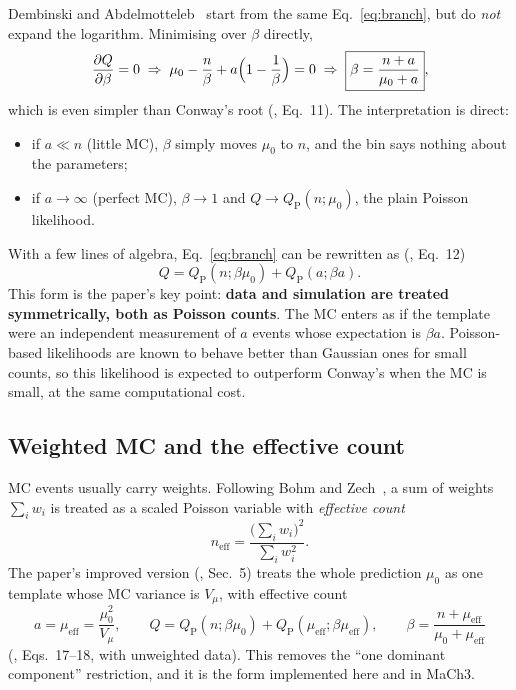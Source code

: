 \documentclass[11pt,a4paper]{article}
\newcommand{\QP}{Q_{\mathrm{P}}}
\begin{document}
Dembinski and Abdelmotteleb~\cite{DA} start from the same Eq.~\eqref{eq:branch}, but do
\emph{not} expand the logarithm. Minimising over $\beta$ directly,
\begin{equation}
  \frac{\partial Q}{\partial\beta}=0 \;\Rightarrow\;
  \mu_0 - \frac{n}{\beta} + a\Bigl(1-\frac1\beta\Bigr) = 0
  \;\Rightarrow\;
  \boxed{\beta = \frac{n+a}{\mu_0+a}} ,
  \label{eq:da-beta}
\end{equation}
which is even simpler than Conway's root (\cite{DA}, Eq.~11). The interpretation is direct:
\begin{itemize}
  \item if $a\ll n$ (little MC), $\beta$ simply moves $\mu_0$ to $n$, and the bin says nothing about
        the parameters;
  \item if $a\to\infty$ (perfect MC), $\beta\to1$ and $Q\to\QP(n;\mu_0)$, the plain Poisson likelihood.
\end{itemize}
With a few lines of algebra, Eq.~\eqref{eq:branch} can be rewritten as (\cite{DA}, Eq.~12)
\begin{equation}
  \boxed{Q = \QP(n;\beta\mu_0) + \QP(a;\beta a)} .
  \label{eq:da}
\end{equation}
This form is the paper's key point: \textbf{data and simulation are treated symmetrically, both as
Poisson counts}. The MC enters as if the template were an independent measurement of $a$ events
whose expectation is $\beta a$. Poisson-based likelihoods are known to behave better than Gaussian
ones for small counts, so this likelihood is expected to outperform Conway's when the MC is small,
at the same computational cost.

\subsection*{Weighted MC and the effective count}

MC events usually carry weights. Following Bohm and Zech~\cite{BohmZech}, a sum of weights
$\sum_i w_i$ is treated as a scaled Poisson variable with \emph{effective count}
\begin{equation}
  n_{\mathrm{eff}} = \frac{\bigl(\sum_i w_i\bigr)^2}{\sum_i w_i^2}.
\end{equation}
The paper's improved version (\cite{DA}, Sec.~5) treats the whole prediction $\mu_0$ as one
template whose MC variance is $V_\mu$, with effective count
\begin{equation}
  a = \mu_{\mathrm{eff}} = \frac{\mu_0^2}{V_\mu}, \qquad
  Q = \QP(n;\beta\mu_0) + \QP(\mu_{\mathrm{eff}};\beta\mu_{\mathrm{eff}}), \qquad
  \beta = \frac{n+\mu_{\mathrm{eff}}}{\mu_0+\mu_{\mathrm{eff}}}
  \label{eq:da-improved}
\end{equation}
(\cite{DA}, Eqs.~17--18, with unweighted data). This removes the ``one dominant component''
restriction, and it is the form implemented here and in MaCh3.
\end{document}

